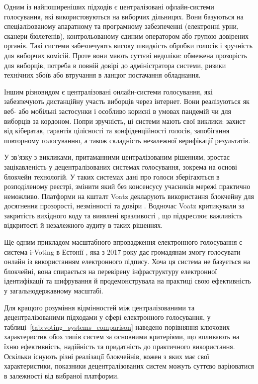 \documentclass[14pt]{extreport}
\begin{document}
  Одним із найпоширеніших підходів є централізовані офлайн-системи голосування, які використовуються на виборчих дільницях. Вони базуються на спеціалізованому апаратному та програмному забезпеченні (електронні урни, сканери бюлетенів), контрольованому єдиним оператором або групою довірених органів. Такі системи забезпечують високу швидкість обробки голосів і зручність для виборчих комісій. Проте вони мають суттєві недоліки: обмежена прозорість для виборців, потреба в повній довірі до адміністратора системи, ризики технічних збоїв або втручання в ланцюг постачання обладнання.

  Іншим різновидом є централізовані онлайн-системи голосування, які забезпечують дистанційну участь виборців через інтернет. Вони реалізуються як веб- або мобільні застосунки і особливо корисні в умовах пандемій чи для виборців за кордоном. Попри зручність, ці системи мають свої виклики: захист від кібератак, гарантія цілісності та конфіденційності голосів, запобігання повторному голосуванню, а також складність незалежної верифікації результатів.
  
  У зв’язку з викликами, притаманними централізованим рішенням, зростає зацікавленість у децентралізованих системах голосування, зокрема на основі блокчейн технологій. У таких системах дані про голоси зберігаються в розподіленому реєстрі, змінити який без консенсусу учасників мережі практично неможливо. Платформи на кшталт Voatz декларують використання блокчейну для досягнення прозорості, незмінності та довіри \cite{voatz}. Водночас Voatz критикували за закритість вихідного коду та виявлені вразливості \cite{voatzcriticism}, що підкреслює важливість відкритості й незалежного аудиту в таких рішеннях.

  Ще одним прикладом масштабного впровадження електронного голосування є система i-Voting в Естонії \cite{ivoting}, яка з 2017 року дає громадянам змогу голосувати онлайн із використанням електронного підпису. Хоча ця система не базується на блокчейні, вона спирається на перевірену інфраструктуру електронної ідентифікації та шифрування й продемонструвала на практиці свою ефективність у загальнодержавному масштабі.
  
  Для кращого розуміння відмінностей між централізованими та децентралізованими підходами у сфері електронного голосування, у таблиці~\ref{tab:voting_systems_comparison} наведено порівняння ключових характеристик обох типів систем за основними критеріями, що впливають на їхню ефективність, надійність та придатність до практичного використання. Оскільки існують різні реалізації блокчейнів, кожен з яких має свої характеристики, показники децентралізованих систем можуть суттєво варіюватися в залежності від вибраної платформи.
  
\end{document}
